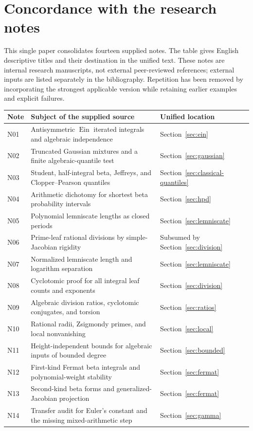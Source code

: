 \documentclass[11pt,a4paper]{article}
\numberwithin{equation}{section}
\theoremstyle{definition}
\theoremstyle{remark}
\newcommand{\Ein}{\operatorname{Ein}}
\begin{document}
\section{Concordance with the research notes}\label{app:concordance}
This single paper consolidates fourteen supplied notes. The table gives
English descriptive titles and their destination in the unified text.
These notes are internal research manuscripts, not external peer-reviewed
references; external inputs are listed separately in the bibliography.
Repetition has been removed by incorporating the strongest applicable
version while retaining earlier examples and explicit failures.

\begin{longtable}{@{}P{0.08\textwidth}P{0.66\textwidth}P{0.20\textwidth}@{}}
\toprule
Note & Subject of the supplied source & Unified location\\
\midrule
\endhead
N01 & Antisymmetric $\Ein$ iterated integrals and algebraic independence &
Section~\ref{sec:ein}\\
N02 & Truncated Gaussian mixtures and a finite algebraic-quantile test &
Section~\ref{sec:gaussian}\\
N03 & Student, half-integral beta, Jeffreys, and Clopper--Pearson quantiles &
Section~\ref{sec:classical-quantiles}\\
N04 & Arithmetic dichotomy for shortest beta probability intervals &
Section~\ref{sec:hpd}\\
N05 & Polynomial lemniscate lengths as closed periods &
Section~\ref{sec:lemniscate}\\
N06 & Prime-leaf rational divisions by simple-Jacobian rigidity &
Subsumed by Section~\ref{sec:division}\\
N07 & Normalized lemniscate length and logarithm separation &
Section~\ref{sec:lemniscate}\\
N08 & Cyclotomic proof for all integral leaf counts and exponents &
Section~\ref{sec:division}\\
N09 & Algebraic division ratios, cyclotomic conjugates, and torsion &
Section~\ref{sec:ratios}\\
N10 & Rational radii, Zsigmondy primes, and local nonvanishing &
Section~\ref{sec:local}\\
N11 & Height-independent bounds for algebraic inputs of bounded degree &
Section~\ref{sec:bounded}\\
N12 & First-kind Fermat beta integrals and polynomial-weight stability &
Section~\ref{sec:fermat}\\
N13 & Second-kind beta forms and generalized-Jacobian projection &
Section~\ref{sec:fermat}\\
N14 & Transfer audit for Euler's constant and the missing mixed-arithmetic
step & Section~\ref{sec:gamma}\\
\bottomrule
\end{longtable}
\end{document}
